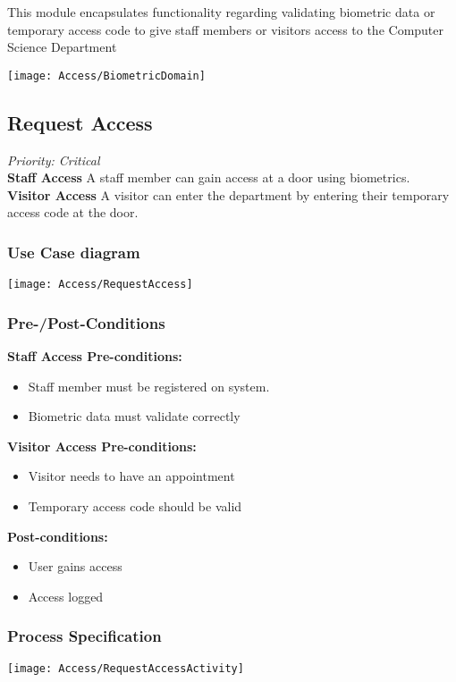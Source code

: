 
This module encapsulates functionality regarding validating biometric data or temporary access code to give staff members or visitors access to the Computer Science Department

\texttt{[image: Access/BiometricDomain]}

\subsection{Request Access}
\textit{Priority: Critical} \\


\textbf{Staff Access} A staff member can gain access at a door using biometrics. \\
\textbf{Visitor Access} A visitor can enter the department by entering their temporary access code at the door.

\subsubsection{Use Case diagram}
\texttt{[image: Access/RequestAccess]}

\subsubsection{Pre-/Post-Conditions}
\textbf{Staff Access Pre-conditions:} 
	\begin{itemize}
		\item Staff member must be registered on system.
		\item Biometric data must validate correctly
	\end{itemize}
\textbf{Visitor Access Pre-conditions:} 
	\begin{itemize}
		\item Visitor needs to have an appointment
		\item Temporary access code should be valid
	\end{itemize}
\textbf{ Post-conditions:} 
	\begin{itemize}
		\item User gains access
		\item Access logged
	\end{itemize}
	
\subsubsection{Process Specification}
	\texttt{[image: Access/RequestAccessActivity]}	


